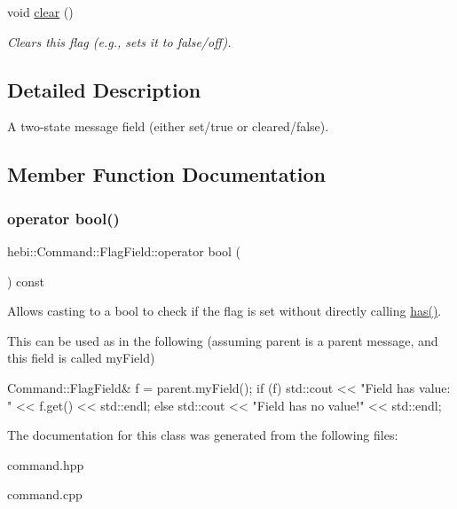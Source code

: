 \begin{DoxyCompactItemize}
\mbox{\label{classhebi_1_1Command_1_1FlagField_aaf1399b14ddc9052ebbca70df5b638d3}} 
void \hyperlink{classhebi_1_1Command_1_1FlagField_aaf1399b14ddc9052ebbca70df5b638d3}{clear} ()
\begin{DoxyCompactList}\small\item\em Clears this flag (e.\+g., sets it to false/off). \end{DoxyCompactList}\end{DoxyCompactItemize}


\subsection{Detailed Description}
A two-\/state message field (either set/true or cleared/false). 

\subsection{Member Function Documentation}
\mbox{\label{classhebi_1_1Command_1_1FlagField_afbe105fefc252d9a0036bc540729287b}} 
\subsubsection{\texorpdfstring{operator bool()}{operator bool()}}
{\footnotesize\ttfamily hebi\+::\+Command\+::\+Flag\+Field\+::operator bool (\begin{DoxyParamCaption}{ }\end{DoxyParamCaption}) const\hspace{0.3cm}{\ttfamily [explicit]}}



Allows casting to a bool to check if the flag is set without directly calling {\ttfamily \hyperlink{classhebi_1_1Command_1_1FlagField_aa1493ce350be33e099dde81586e9ac3c}{has()}}. 

This can be used as in the following (assuming \textquotesingle{}parent\textquotesingle{} is a parent message, and this field is called \textquotesingle{}my\+Field\textquotesingle{}) 
\begin{DoxyCode}
Command::FlagField& f = parent.myField();
\textcolor{keywordflow}{if} (f)
  std::cout << \textcolor{stringliteral}{"Field has value: "} << f.get() << std::endl;
\textcolor{keywordflow}{else}
  std::cout << \textcolor{stringliteral}{"Field has no value!"} << std::endl;
\end{DoxyCode}
 

The documentation for this class was generated from the following files\+:\begin{DoxyCompactItemize}
\item 
command.\+hpp\item 
command.\+cpp\end{DoxyCompactItemize}
